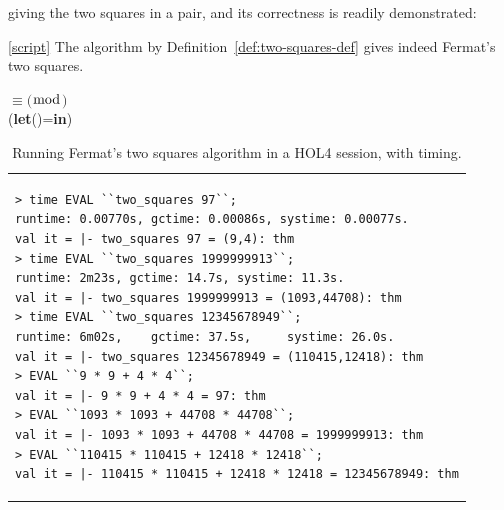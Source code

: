 \documentclass[sigplan,screen]{acmart}
\newcommand\urlpre{https://bitbucket.org/jhlchan/project/src/aed43871448e/fermat/twosq/}
\newcommand{\script}[3][script]{\href{\urlpre#2Script.sml\#lines-#3}{[#1]}} %
\newcommand{\script}[3][script]{\textit{[script]}} %
\renewcommand{\HOLConst}[1]{{\fontsize{9pt}{1em}\selectfont\textsf{\upshape #1}}}
\renewcommand{\HOLNumLit}[1]{{\selectfont\textrm{\upshape #1}}} %
\renewcommand{\HOLSymConst}[1]{{\fontsize{9pt}{1em}\selectfont\textsf{\upshape #1}}}
\renewcommand{\HOLKeyword}[1]{\mbox{\upshape\fontsize{9pt}{1em}\selectfont\bfseries{\textsf{#1}}}}
\begin{document}
\noindent
giving the two squares in a pair,
and its correctness is readily demonstrated:
\begin{theorem}
\label{thm:two-squares-thm}
\script{twoSquares}{1041}
The algorithm by Definition~\ref{def:two-squares-def} gives indeed Fermat's two squares.
\begin{HOLmath}
\HOLTokenTurnstile{}\HOLConst{prime}\;\;\HOLSymConst{\HOLTokenConj{}}\;\;\ensuremath{\equiv}\;\HOLNumLit{1}\;\ensuremath{(}\ensuremath{\bmod}\;\HOLNumLit{4}\ensuremath{)}\;\HOLSymConst{\HOLTokenImp{}}\\
\;\;\;\;\;\;\;(\HOLKeyword{let}\;(\HOLBoundVar{u}\HOLSymConst{,})\;=\;\HOLConst{two_squares}\;\;\HOLKeyword{in}\;\;\HOLSymConst{=}\;\HOLBoundVar{u}\HOLSymConst{\ensuremath{\sp{2}}}\;\HOLSymConst{\ensuremath{+}}\;\HOLBoundVar{v}\HOLSymConst{\ensuremath{\sp{2}}})
\end{HOLmath}
\end{theorem}

\begin{table}[h] %
\caption{Running Fermat's two squares algorithm in a HOL4 session, with timing.}
\label{tbl:sample-run}  %
\begin{tabular}{p{}}
\begin{verbatim}
> time EVAL ``two_squares 97``;
runtime: 0.00770s, gctime: 0.00086s, systime: 0.00077s.
val it = |- two_squares 97 = (9,4): thm
> time EVAL ``two_squares 1999999913``;
runtime: 2m23s, gctime: 14.7s, systime: 11.3s.
val it = |- two_squares 1999999913 = (1093,44708): thm
> time EVAL ``two_squares 12345678949``;
runtime: 6m02s,    gctime: 37.5s,     systime: 26.0s.
val it = |- two_squares 12345678949 = (110415,12418): thm
> EVAL ``9 * 9 + 4 * 4``;
val it = |- 9 * 9 + 4 * 4 = 97: thm
> EVAL ``1093 * 1093 + 44708 * 44708``;
val it = |- 1093 * 1093 + 44708 * 44708 = 1999999913: thm
> EVAL ``110415 * 110415 + 12418 * 12418``;
val it = |- 110415 * 110415 + 12418 * 12418 = 12345678949: thm
\end{verbatim}
\end{tabular}
\end{table}
\end{document}
